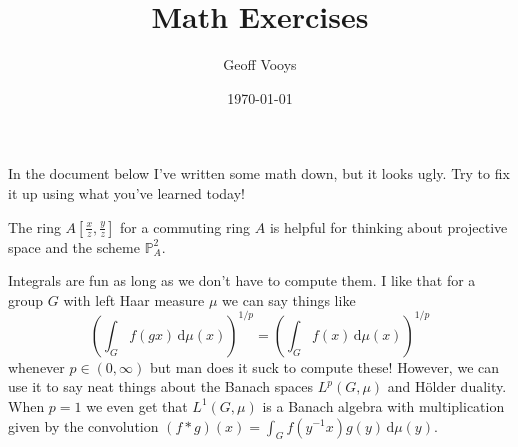 \documentclass[10pt]{article}
\title{Math Exercises}
\author{Geoff Vooys}
\date{\today}
\numberwithin{Theorem}{section}
\begin{document}
\maketitle

In the document below I've written some math down, but it looks ugly. Try to fix it up using what you've learned today!

The ring $A[\frac{x}{z}, \frac{y}{z}]$ for a commuting ring $A$ is helpful for thinking about projective space and the scheme $\mathbb{P}_A^2$.

Integrals are fun as long as we don't have to compute them. I like that for a group $G$ with left Haar measure $\mu$ we can say things like
\[
(\int_G f(gx)\,\mathrm{d}\mu(x))^{1/p} = (\int_G f(x)\,\mathrm{d}\mu(x))^{1/p}
\]
whenever $p \in (0,\infty)$ but man does it suck to compute these! However, we can use it to say neat things about the Banach spaces $L^p(G,\mu)$ and H{\"o}lder duality. When $p = 1$ we even get that $L^1(G,\mu)$ is a Banach algebra with multiplication given by the convolution $(f \ast g)(x) = \int_G f(y^{-1}x)g(y)\,\mathrm{d}\mu(y)$.
\end{document}
